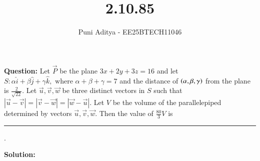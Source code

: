 \documentclass[journal]{IEEEtran}
\begin{document}
\title{2.10.85}
\author{Puni Aditya - EE25BTECH11046}
\maketitle

\textbf{Question:}
Let $\vec{P}$ be the plane $3x + 2y + 3z = 16$ and let 
$S : \alpha \hat{i} + \beta \hat{j} + \gamma \hat{k},\text{ where } \alpha + \beta + \gamma = 7$
and the distance of $\left(\alpha, \beta, \gamma\right)$ from the plane is $\frac{2}{\sqrt{22}}$.
Let $\vec{u}, \vec{v}, \vec{w}$ be three distinct vectors in $S$ such that $|\vec{u} - \vec{v}| = |\vec{v} - \vec{w}| = |\vec{w} - \vec{u}|$. Let $V$ be the volume of the parallelepiped determined by vectors $\vec{u}, \vec{v}, \vec{w}$. Then the value of $\frac{80}{3} V$ is
\rule{1cm}{0.1pt}.

\textbf{Solution:}
\end{document}
